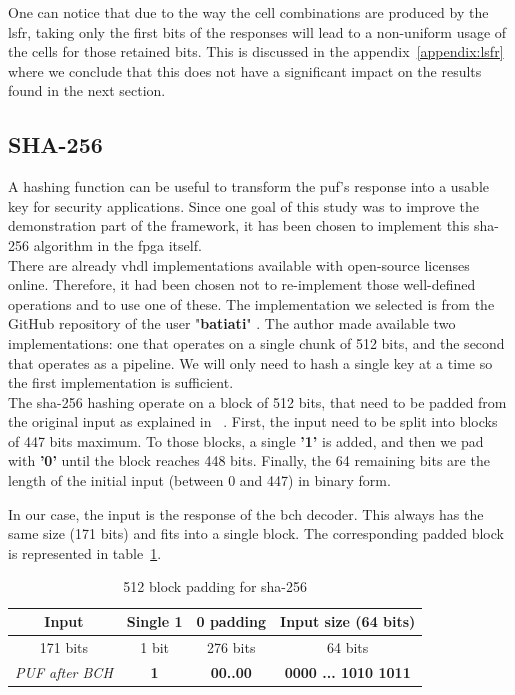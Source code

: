 One can notice that due to the way the cell combinations are produced by the \acrshort{lsfr}, taking only the first bits of the responses will lead to a non-uniform usage of the cells for those retained bits. This is discussed in the appendix~\ref{appendix:lsfr} where we conclude that this does not have a significant impact on the results found in the next section.



\subsection{SHA-256}
\label{subsec:demon_feature_sha}

A hashing function can be useful to transform the \acrshort{puf}'s response into a usable key for security applications. Since one goal of this study was to improve the demonstration part of the framework, it has been chosen to implement this \acrshort{sha}-256 algorithm in the \acrshort{fpga} itself.\\

There are already \acrshort{vhdl} implementations available with open-source licenses online. Therefore, it had been chosen not to re-implement those well-defined operations and to use one of these. The implementation we selected is from the GitHub repository of the user "\textbf{batiati}" \cite{batiati_vhdl_2021}. The author made available two implementations: one that operates on a single chunk of 512 bits, and the second that operates as a pipeline. We will only need to hash a single key at a time so the first implementation is sufficient.\\

The \acrshort{sha}-256 hashing operate on a block of 512 bits, that need to be padded from the original input as explained in ~\cite{technology_secure_2015}. First, the input need to be split into blocks of 447 bits maximum. To those blocks, a single \textbf{'1'} is added, and then we pad with \textbf{'0'} until the block reaches 448 bits. Finally, the 64 remaining bits are the length of the initial input (between 0 and 447) in binary form.

In our case, the input is the response of the \acrshort{bch} decoder. This always has the same size (171 bits) and fits into a single block. The corresponding padded block is represented in table~\ref{tab:sha256_padding}.\\

\begin{table}[H]
    \centering
    \begin{tabular}{|c|c|c|c|}
        \hline
        Input & Single \textbf{1} & \textbf{0} padding & Input size (64 bits)\\
        \hline
        171 bits & 1 bit & 276 bits & 64 bits\\
        \hline
        \textit{PUF after BCH} & \textbf{1} & \textbf{00..00} & \textbf{0000 ... 1010 1011} \\
        \hline
    \end{tabular}
    \caption{512 block padding for \acrshort{sha}-256}
    \label{tab:sha256_padding}
\end{table}

